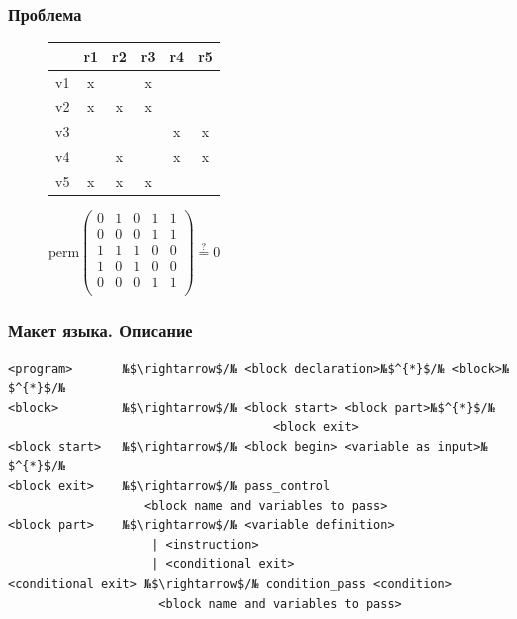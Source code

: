 \documentclass[10pt,a4paper]{beamer}
\begin{document}
\begin{frame}[fragile]
    \frametitle{Проблема}
    \begin{figure}[h]
        \begin{minipage}[h]{0.47\linewidth}
            \begin{tabular}{*{6}{|c}|}
                \hline
                & r1 & r2 & r3 & r4 & r5\\
                \hline
                v1 & x& & x& & \\
                \hline
                v2 & x& x& x& & \\
                \hline
                v3 & & & & x&x \\
                \hline
                v4 & &x & & x&x \\
                \hline
                v5 & x& x&x & & \\
                \hline
            \end{tabular}
        \end{minipage}
        \begin{minipage}[h]{0.47\linewidth}
            $\text{perm}\left(
            \begin{array}{*{5}{c}}
                0&1&0&1&1\\
                0&0&0&1&1\\
                1&1&1&0&0\\
                1&0&1&0&0\\
                0&0&0&1&1\\
            \end{array}\right) \overset{?}{=} 0$
        \end{minipage}

    \end{figure}

\end{frame}

\begin{frame}[fragile]
    \frametitle{Макет языка. Описание}
\begin{lstlisting}
<program>       №$\rightarrow$/№ <block declaration>№$^{*}$/№ <block>№$^{*}$/№
<block>         №$\rightarrow$/№ <block start> <block part>№$^{*}$/№
                                     <block exit>
<block start>   №$\rightarrow$/№ <block begin> <variable as input>№$^{*}$/№
<block exit>    №$\rightarrow$/№ pass_control
                   <block name and variables to pass>
<block part>    №$\rightarrow$/№ <variable definition> 
                    | <instruction>
                    | <conditional exit>
<conditional exit> №$\rightarrow$/№ condition_pass <condition>
                     <block name and variables to pass>
\end{lstlisting}

\end{frame}
\end{document}

